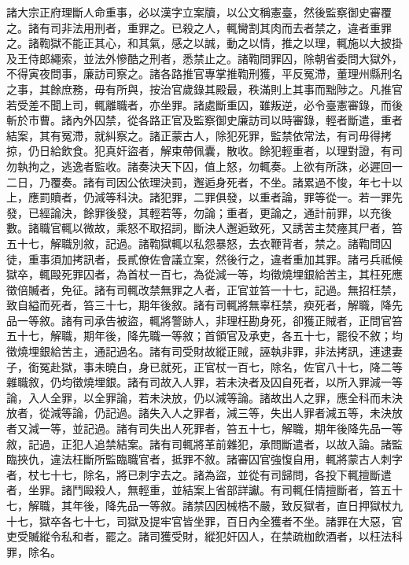 \begin{pinyinscope}
 諸大宗正府理斷人命重事，必以漢字立案牘，以公文稱憲臺，然後監察御史審覆之。諸有司非法用刑者，重罪之。已殺之人，輒臠割其肉而去者禁之，違者重罪之。諸鞫獄不能正其心，和其氣，感之以誠，動之以情，推之以理，輒施以大披掛及王侍郎繩索，並法外慘酷之刑者，悉禁止之。諸鞫問罪囚，除朝省委問大獄外，不得寅夜問事，廉訪司察之。諸各路推官專掌推鞫刑獲，平反冤滯，董理州縣刑名之事，其餘庶務，毋有所與，按治官歲錄其殿最，秩滿則上其事而黜陟之。凡推官若受差不聞上司，輒離職者，亦坐罪。諸處斷重囚，雖叛逆，必令臺憲審錄，而後斬於市曹。諸內外囚禁，從各路正官及監察御史廉訪司以時審錄，輕者斷遣，重者結案，其有冤滯，就糾察之。諸正蒙古人，除犯死罪，監禁依常法，有司毋得拷掠，仍日給飲食。犯真奸盜者，解束帶佩囊，散收。餘犯輕重者，以理對證，有司勿執拘之，逃逸者監收。諸奏決天下囚，值上怒，勿輒奏。上欲有所誅，必遲回一二日，乃覆奏。諸有司因公依理決罰，邂逅身死者，不坐。諸累過不悛，年七十以上，應罰贖者，仍減等科決。諸犯罪，二罪俱發，以重者論，罪等從一。若一罪先發，已經論決，餘罪後發，其輕若等，勿論；重者，更論之，通計前罪，以充後數。諸職官輒以微故，乘怒不取招詞，斷決人邂逅致死，又誘苦主焚瘞其尸者，笞五十七，解職別敘，記過。諸鞫獄輒以私怨暴怒，去衣鞭背者，禁之。諸鞫問囚徒，重事須加拷訊者，長貳僚佐會議立案，然後行之，違者重加其罪。諸弓兵祗候獄卒，輒毆死罪囚者，為首杖一百七，為從減一等，均徵燒埋銀給苦主，其枉死應徵倍贓者，免征。諸有司輒改禁無罪之人者，正官並笞一十七，記過。無招枉禁，致自縊而死者，笞三十七，期年後敘。諸有司輒將無辜枉禁，瘐死者，解職，降先品一等敘。諸有司承告被盜，輒將警跡人，非理枉勘身死，卻獲正賊者，正問官笞五十七，解職，期年後，降先職一等敘；首領官及承吏，各五十七，罷役不敘；均徵燒埋銀給苦主，通記過名。諸有司受財故縱正賊，誣執非罪，非法拷訊，連逮妻子，銜冤赴獄，事未曉白，身已就死，正官杖一百七，除名，佐官八十七，降二等雜職敘，仍均徵燒埋銀。諸有司故入人罪，若未決者及囚自死者，以所入罪減一等論，入人全罪，以全罪論，若未決放，仍以減等論。諸故出人之罪，應全科而未決放者，從減等論，仍記過。諸失入人之罪者，減三等，失出人罪者減五等，未決放者又減一等，並記過。諸有司失出人死罪者，笞五十七，解職，期年後降先品一等敘，記過，正犯人追禁結案。諸有司輒將革前雜犯，承問斷遣者，以故入論。諸監臨挾仇，違法枉斷所監臨職官者，抵罪不敘。諸審囚官強愎自用，輒將蒙古人刺字者，杖七十七，除名，將已刺字去之。諸為盜，並從有司歸問，各投下輒擅斷遣者，坐罪。諸鬥毆殺人，無輕重，並結案上省部詳讞。有司輒任情擅斷者，笞五十七，解職，其年後，降先品一等敘。諸禁囚因械梏不嚴，致反獄者，直日押獄杖九十七，獄卒各七十七，司獄及提牢官皆坐罪，百日內全獲者不坐。諸罪在大惡，官吏受贓縱令私和者，罷之。諸司獲受財，縱犯奸囚人，在禁疏枷飲酒者，以枉法科罪，除名。




\end{pinyinscope}
